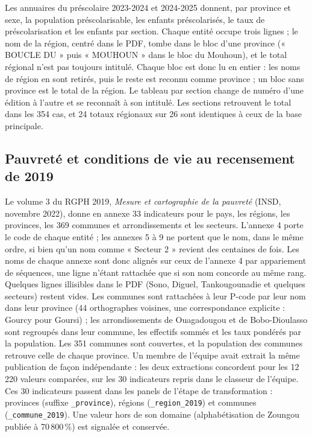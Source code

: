 \documentclass{article}
\begin{document}
Les annuaires du préscolaire 2023-2024 et 2024-2025 donnent, par province et sexe, la population préscolarisable, les enfants préscolarisés, le taux de préscolarisation et les enfants par section. Chaque entité occupe trois lignes ; le nom de la région, centré dans le PDF, tombe dans le bloc d'une province (« BOUCLE DU » puis « MOUHOUN » dans le bloc du Mouhoun), et le total régional n'est pas toujours intitulé. Chaque bloc est donc lu en entier : les noms de région en sont retirés, puis le reste est reconnu comme province ; un bloc sans province est le total de la région. Le tableau par section change de numéro d'une édition à l'autre et se reconnaît à son intitulé. Les sections retrouvent le total dans les 354 cas, et 24 totaux régionaux sur 26 sont identiques à ceux de la base principale.

\subsection{Pauvreté et conditions de vie au recensement de 2019}

Le volume 3 du RGPH 2019, \emph{Mesure et cartographie de la pauvreté} (INSD, novembre 2022), donne en annexe 33 indicateurs pour le pays, les régions, les provinces, les 369 communes et arrondissements et les secteurs. L'annexe 4 porte le code de chaque entité ; les annexes 5 à 9 ne portent que le nom, dans le même ordre, si bien qu'un nom comme « Secteur 2 » revient des centaines de fois. Les noms de chaque annexe sont donc alignés sur ceux de l'annexe 4 par appariement de séquences, une ligne n'étant rattachée que si son nom concorde au même rang. Quelques lignes illisibles dans le PDF (Sono, Diguel, Tankougounadie et quelques secteurs) restent vides. Les communes sont rattachées à leur P-code par leur nom dans leur province (44 orthographes voisines, une correspondance explicite : Gourcy pour Goursi) ; les arrondissements de Ouagadougou et de Bobo-Dioulasso sont regroupés dans leur commune, les effectifs sommés et les taux pondérés par la population. Les 351 communes sont couvertes, et la population des communes retrouve celle de chaque province. Un membre de l'équipe avait extrait la même publication de façon indépendante : les deux extractions concordent pour les 12\,220 valeurs comparées, sur les 30 indicateurs repris dans le classeur de l'équipe. Ces 30 indicateurs passent dans les panels de l'étape de transformation : provinces (suffixe \texttt{\_province}), régions (\texttt{\_region\_2019}) et communes (\texttt{\_commune\_2019}). Une valeur hors de son domaine (alphabétisation de Zoungou publiée à 70\,800\,\%) est signalée et conservée.
\end{document}
